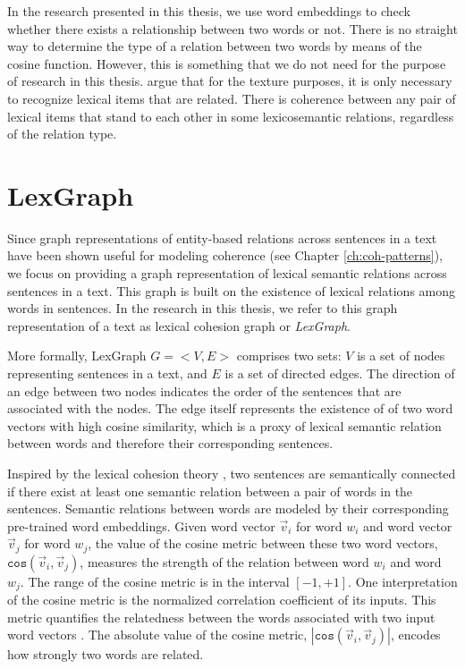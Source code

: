 In the research presented in this thesis, we use word embeddings to check whether there exists a relationship between two words or not.  
There is no straight way to determine the type of a relation between two words by means of the cosine function. 
However, this is something that we do not need for the purpose of research in this thesis. 
 argue that for the texture purposes, it is only necessary to recognize lexical items that are related. 
There is coherence between any pair of lexical items that stand to each other in some lexicosemantic relations, regardless of the relation type. 

\section{LexGraph}
\label{sec:lex-graph-representation}

Since graph representations of entity-based relations across sentences in a text have been shown useful for modeling coherence (see Chapter \ref{ch:coh-patterns}), we focus on providing a graph representation of lexical semantic relations across sentences in a text. 
This graph is built on the existence of lexical relations among words in sentences. 
In the research in this thesis, we refer to this graph representation of a text as lexical cohesion graph or \emph{LexGraph}. 

More formally, LexGraph $G=<V,E>$ comprises two sets: $V$ is a set of nodes representing sentences in a text, and $E$ is a set of directed edges. 
The direction of an edge between two nodes indicates the order of the sentences that are associated with the nodes. 
The edge itself represents the existence of of two word vectors with high cosine similarity, which is a proxy of lexical semantic relation between words and therefore their corresponding sentences. 

Inspired by the lexical cohesion theory \cite{halliday76}, two sentences are semantically connected if there exist at least one semantic relation between a pair of words in the sentences. 
Semantic relations between words are modeled by their corresponding pre-trained word embeddings.  
Given word vector $\vec{v}_i$ for word $w_i$ and word vector $\vec{v}_j$ for word $w_j$, the value of the cosine metric between these two word vectors, $\mathtt{cos}(\vec{v}_i,\vec{v}_j)$, measures the strength of the relation between word $w_i$ and word $w_j$. 
The range of the cosine metric is in the interval $\left[ -1, +1 \right]$.  
One interpretation of the cosine metric is the normalized correlation coefficient of its inputs.
This metric quantifies the relatedness between the words associated with two input word vectors \cite{manning99}. 
The absolute value of the cosine metric, $|\mathtt{cos}(\vec{v}_i,\vec{v}_j)|$, encodes how strongly two words are related.  

